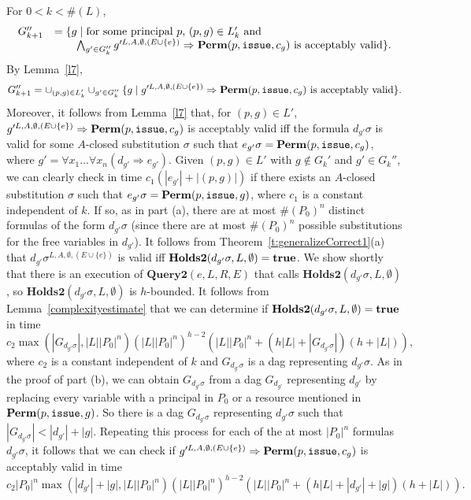 \documentclass{acmtrans2m}
\newcommand{\rimp}{\Rightarrow}
\newcommand{\<}{
}
\renewcommand{\>}{\rangle}
\newcommand{\union}{\cup}
\newcommand{\len}[1]{|#1|}
\newcommand{\card}[1]{\#({#1})}
\newcommand{\true}{\mathit{\bf{true}}}
\newcommand{\Permitted}{\mathit{\bf Perm}}
\newcommand{\cd}{d}
\newcommand{\cc}{e}
\newcommand{\scc}{E}
\newcommand{\issue}{\mathtt{issue}}
\newcommand{\XProcTwo}{\textbf{Query2}}
\newcommand{\CMetTwo}{\textbf{Holds2}}
\newcommand{\transwithE}[5]{#1^{#2, #3, #4, #5}}
\begin{document}
\begin{sloppypar}
For $0 < k < \card{L}$,
\[
\begin{array}{ll}
G''_{k+1} &= \{g\mid\mbox{for some principal $p$, } (p,g)\in L'_k \mbox{ and }\\
&\qquad \bigwedge_{g'\in G''_{k}} \transwithE{g'}{L}{A}{\emptyset}{(E\union\{\cc\})}\rimp
\Permitted(p,\issue, c_g)\mbox{ is acceptably valid}\}.
\end{array}
\]
By Lemma~\ref{l7},
\[
G_{k+1}'' = \union_{(p,g) \in L_k'} \union_{g' \in G_k''}\{g\mid \transwithE{g'}{L}{A}{\emptyset}
{(E\union\{\cc\})}\rimp\Permitted(p,\issue, c_g)\mbox{ is acceptably valid}\}.
\]
Moreover, it follows from Lemma~\ref{l7} that, for $(p,g) \in L'$,
$\transwithE{g'}{L}{A}{\emptyset}{(E\union\{\cc\})}\rimp\Permitted(p,\issue, c_g)$  is acceptably
valid iff the formula $d_{g'} \sigma$ is valid for some $A$-closed substitution $\sigma$ such that
$e_{g'} \sigma = \Permitted(p,\issue,c_g)$, where
$g' = \forall x_1 \ldots \forall x_n (d_{g'} \rimp e_{g'})$.  Given $(p,g) \in L'$ with
$g \notin G_k'$ and $g' \in G_{k}''$, we can clearly check in time $c_1(|e_{g'}| + |(p,g)|)$ if
there exists an $A$-closed substitution $\sigma$ such that $e_{g'}\sigma = \Permitted(p,\issue,g)$,
where $c_1$ is a constant independent of $k$.  If so, as in part (a), there are at most
$\card{P_0}^n$ distinct formulas of the form $d_{g'}\sigma$ (since there are at most $\card{P_0}^n$
possible substitutions for the free variables in $d_{g'}$).  It follows from
Theorem~\ref{t:generalizeCorrect1}(a) that
$\transwithE{\cd_{g'}\sigma}{L}{A}{\emptyset}{(\scc\union\{\cc\})}$ is valid iff
$\CMetTwo(\cd_{g'}\sigma, L, \emptyset) = \true$.  We show shortly that there is an execution of
$\XProcTwo(\cc, L, R, \scc)$ that calls $\CMetTwo(\cd_{g'}\sigma, L, \emptyset)$, so
$\CMetTwo(\cd_{g'}\sigma, L, \emptyset)$ is $h$-bounded.  It follows from
Lemma~\ref{complexityestimate} that we can determine if
$\CMetTwo(\cd_{g'}\sigma, L, \emptyset) = \true$ in time
$
c_2\max(\len{G_{\cd_{g'}\sigma}}, \len{L}\len{P_0}^n) (\len{L}\len{P_0}^n)^{h-2}
(\len{L}\len{P_0}^n + (h\len{L} + \len{G_{\cd_{g'}\sigma}})(h + \len{L})),
$
where $c_2$ is a constant independent of $k$ and $G_{\cd_{g'}\sigma}$ is a dag representing
$\cd_{g'}\sigma$.  As in the proof of part (b), we can obtain $G_{\cd_{g'}\sigma}$ from a dag
$G_{\cd_{g'}}$ representing $\cd_{g'}$ by replacing every variable with a principal in $P_0$ or a
resource mentioned in $\Permitted(p, \issue, g)$.  So there is a dag $G_{\cd_{g'}\sigma}$
representing $\cd_{g'}\sigma$ such that $\len{G_{\cd_{g'}\sigma}} < \len{\cd_{g'}} + \len{g}$.
Repeating this process for each of the at most $\len{P_0}^n$ formulas $\cd_{g'}\sigma$, it follows
that we can check if
$\transwithE{g'}{L}{A}{\emptyset}{(E\union\{\cc\})}\rimp\Permitted(p, \issue, c_g)$  is acceptably
valid in time
$c_2\len{P_0}^n\max(\len{\cd_{g'}}+\len{g}, \len{L}\len{P_0}^n) (\len{L}\len{P_0}^n)^{h-2}
(\len{L}\len{P_0}^n + (h\len{L} + \len{\cd_{g'}}+\len{g})(h + \len{L})).$


\end{sloppypar}
\end{document}
